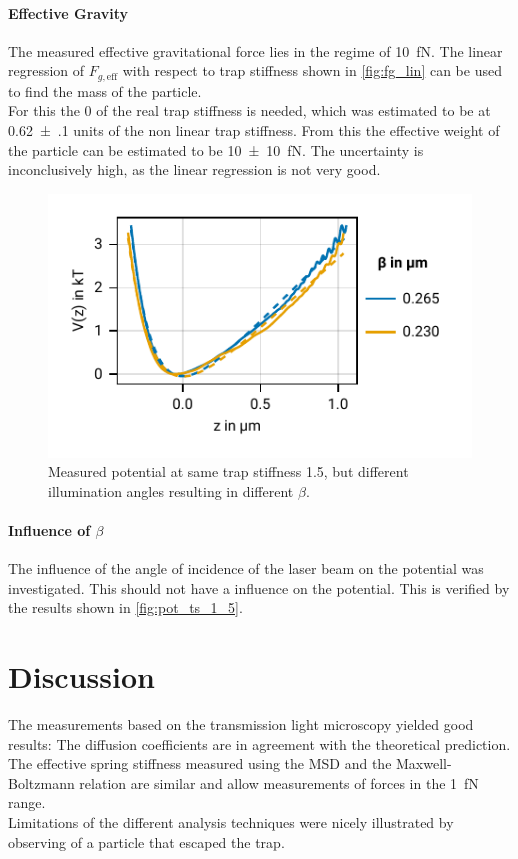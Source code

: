 \documentclass[
    twoside=false,
    twocolumn=true,
    fontsize=11pt,
]{scrarticle}
\begin{document}
\paragraph{Effective Gravity}
The measured effective gravitational force lies in the regime of \SI{10}{\femto N}.
The linear regression of $F_{g,\text{eff}}$ with respect to trap stiffness shown in \autoref{fig:fg_lin} can be used to find the mass of the particle. \\
For this the $0$ of the real trap stiffness is needed, which was estimated to be at \SI{.62(10)}{} units of the non linear trap stiffness.
From this the effective weight of the particle can be estimated to be \SI{10(10)}{\femto N}.
The uncertainty is inconclusively high, as the linear regression is not very good.

\begin{figure}
    \centering
    \includegraphics{figures/02_06_01_different_beta.pdf}
    \caption{Measured potential at same trap stiffness \SI{1.5}{}, but different illumination angles resulting in different $\beta$.}
    \label{fig:pot_ts_1_5}
\end{figure}
\paragraph{Influence of $\beta$}
The influence of the angle of incidence of the laser beam on the potential was investigated.
This should not have a influence on the potential.
This is verified by the results shown in \autoref{fig:pot_ts_1_5}.

\clearpage
\section{Discussion}
The measurements based on the transmission light microscopy yielded good results:
The diffusion coefficients are in agreement with the theoretical prediction.
The effective spring stiffness measured using the MSD and the Maxwell-Boltzmann relation are similar and allow measurements of forces in the \SI{1}{\femto N} range.\\
Limitations of the different analysis techniques were nicely illustrated by observing of a particle that escaped the trap.
\end{document}
